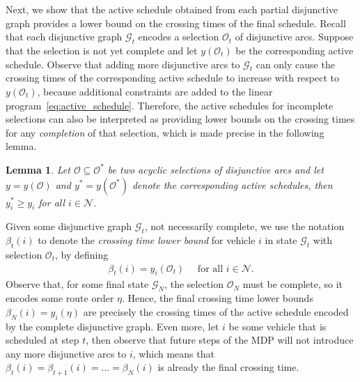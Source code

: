 \documentclass[a4paper]{report}
\theoremstyle{definition}
\theoremstyle{plain}
\newtheorem{lemma}{Lemma}[chapter]
\begin{document}
Next, we show that the active schedule obtained from each partial disjunctive
graph provides a lower bound on the crossing times of the final schedule.
%
Recall that each disjunctive graph $\mathcal{G}_t$ encodes a selection
$\mathcal{O}_t$ of disjunctive arcs.
%
Suppose that the selection is not yet complete and let $y(\mathcal{O}_t)$ be the
corresponding active schedule.
%
Observe that adding more disjunctive arcs to $\mathcal{G}_t$ can only cause the
crossing times of the corresponding active schedule to increase with respect to
$y(\mathcal{O}_t)$, because additional constraints are added to the linear
program~\eqref{eq:active_schedule}.
%
Therefore, the active schedules for incomplete selections can also be
interpreted as providing lower bounds on the crossing times for any \emph{completion}
of that selection, which is made precise in the following lemma.
%
\begin{lemma}
  Let $\mathcal{O} \subseteq \mathcal{O}^*$ be two acyclic selections of disjunctive
  arcs and let $y = y(\mathcal{O})$ and $y^* = y(\mathcal{O}^{*})$ denote the
  corresponding active schedules, then $y^{*}_i \geq y_i$ for all
  $i \in \mathcal{N}$.
\end{lemma}

\noindent
Given some disjunctive graph $\mathcal{G}_t$, not necessarily complete, we use
the notation $\beta_t(i)$ to denote the \emph{crossing time lower bound} for vehicle $i$ in
state $\mathcal{G}_t$ with selection $\mathcal{O}_t$, by defining
\begin{align}
  \beta_t(i) = y_i(\mathcal{O}_t) \quad \text{ for all } i \in \mathcal{N} .
\end{align}
%
Observe that, for some final state $\mathcal{G}_N$, the selection
$\mathcal{O}_N$ must be complete, so it encodes some route order $\eta$. Hence,
the final crossing time lower bounds $\beta_N(i) = y_i(\eta)$ are precisely the
crossing times of the active schedule encoded by the complete disjunctive graph.
%
Even more, let $i$ be some vehicle that is scheduled at step $t$, then observe
that future steps of the MDP will not introduce any more disjunctive arcs to
$i$, which means that $\beta_t(i) = \beta_{t+1}(i) = \dots = \beta_N(i)$ is
already the final crossing time.
\end{document}

